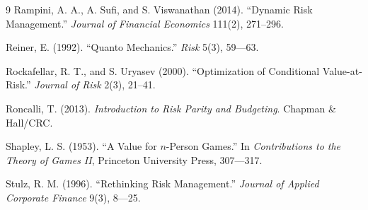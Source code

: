 \documentclass[11pt,a4paper]{article}
\begin{document}
\begin{thebibliography}{9}
 Rampini, A. A., A. Sufi, and S. Viswanathan (2014). ``Dynamic Risk Management.'' \emph{Journal of Financial Economics} 111(2), 271--296.

 Reiner, E. (1992). ``Quanto Mechanics.'' \emph{Risk} 5(3), 59---63.

 Rockafellar, R. T., and S. Uryasev (2000). ``Optimization of Conditional Value-at-Risk.'' \emph{Journal of Risk} 2(3), 21--41.

 Roncalli, T. (2013). \emph{Introduction to Risk Parity and Budgeting}. Chapman \& Hall/CRC.

 Shapley, L. S. (1953). ``A Value for $n$-Person Games.'' In \emph{Contributions to the Theory of Games II}, Princeton University Press, 307---317.

 Stulz, R. M. (1996). ``Rethinking Risk Management.'' \emph{Journal of Applied Corporate Finance} 9(3), 8---25.

\end{thebibliography}
\end{document}
